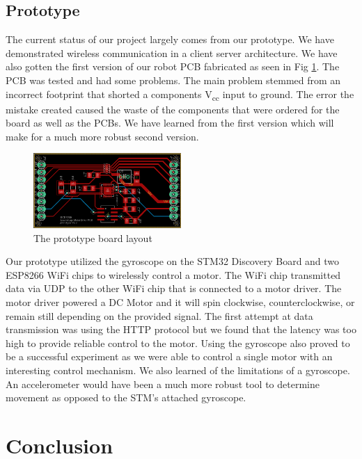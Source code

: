 \documentclass[11pt]{ieeeconf}
\begin{document}
\subsection{Prototype}
The current status of our project largely comes from our prototype. We have demonstrated wireless communication in a client server architecture. We have also gotten the first version of our robot PCB fabricated as seen in Fig \ref{prototype}. The PCB was tested and had some problems. The main problem stemmed from an incorrect footprint that shorted a components V\textsubscript{cc} input to ground. The error the mistake created caused the waste of the components that were ordered for the board as well as the PCBs. We have learned from the first version which will make for a much more robust second version.

\begin{figure}[H]
\centering
\captionsetup{justification=centering}
\includegraphics[width=0.5\textwidth]{images/prototype.png}
\caption{The prototype board layout}
\label{prototype}
\end{figure}

Our prototype utilized the gyroscope on the STM32 Discovery Board and two ESP8266 WiFi chips to wirelessly control a motor. The WiFi chip transmitted data via UDP to the other WiFi chip that is connected to a motor driver. The motor driver powered a DC Motor and it will spin clockwise, counterclockwise, or remain still depending on the provided signal. The first attempt at data transmission was using the HTTP protocol but we found that the latency was too high to provide reliable control to the motor. Using the gyroscope also proved to be a successful experiment as we were able to control a single motor with an interesting control mechanism. We also learned of the limitations of a gyroscope. An accelerometer would have been a much more robust tool to determine movement as opposed to the STM's attached gyroscope.  

\section{Conclusion}



\end{document}
